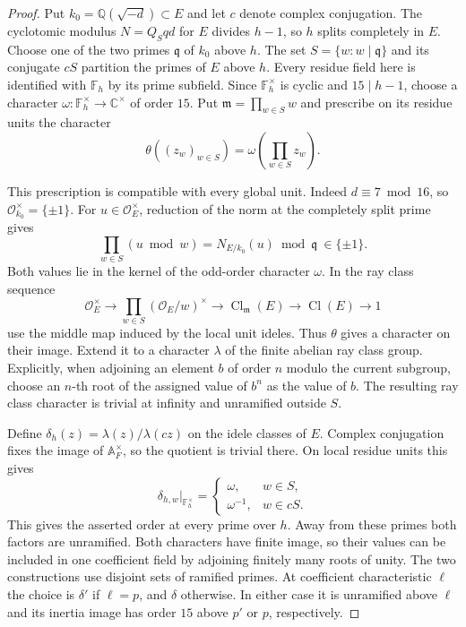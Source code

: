 \begin{proof}
Put \(k_0=\mathbb Q(\sqrt{-d})\subset E\) and let \(c\) denote complex
conjugation. The cyclotomic modulus \(N=Q_Sqd\) for \(E\) divides
\(h-1\), so \(h\) splits completely in \(E\).
Choose one of the two primes \(\mathfrak q\) of \(k_0\) above \(h\).
The set \(S=\{w:w\mid\mathfrak q\}\) and its conjugate \(cS\)
partition the primes of \(E\) above \(h\). Every residue field here
is identified with \(\mathbb F_h\) by its prime subfield.
Since \(\mathbb F_h^\times\) is cyclic and \(15\mid h-1\), choose
a character \(\omega:\mathbb F_h^\times\to\mathbb C^\times\) of order
\(15\). Put \(\mathfrak m=\prod_{w\in S}w\) and prescribe on its residue
units the character
\[
        \theta((z_w)_{w\in S})=\omega\!\left(\prod_{w\in S}z_w\right).
\]

This prescription is compatible with every global unit. Indeed
\(d\equiv7\bmod16\), so \(\mathcal O_{k_0}^\times=\{\pm1\}\). For
\(u\in\mathcal O_E^\times\), reduction of the norm at the completely
split prime gives
\[
       \prod_{w\in S}(u\bmod w)
          =N_{E/k_0}(u)\bmod\mathfrak q\ \in\{\pm1\}.
\]
Both values lie in the kernel of the odd-order character \(\omega\).
In the ray class sequence
\[
 \mathcal O_E^\times \longrightarrow
 \prod_{w\in S}(\mathcal O_E/w)^\times\longrightarrow
 \operatorname{Cl}_{\mathfrak m}(E)\longrightarrow
 \operatorname{Cl}(E)\longrightarrow 1
\]
use the middle map induced by the local unit ideles.
Thus \(\theta\) gives a character on their image.
Extend it to a character \(\lambda\) of the finite abelian ray class
group. Explicitly, when adjoining an element \(b\) of order \(n\)
modulo the current subgroup, choose an \(n\)-th root of the assigned
value of \(b^n\) as the value of \(b\). The resulting ray class
character is trivial at infinity and unramified outside \(S\).

Define \(\delta_h(z)=\lambda(z)/\lambda(cz)\) on the idele classes
of \(E\). Complex conjugation fixes the image of \(\mathbb A_F^\times\),
so the quotient is trivial there. On local residue units this gives
\[
 \delta_{h,w}|_{\mathbb F_h^\times}=
       \begin{cases}\omega,&w\in S,\\ \omega^{-1},&w\in cS.\end{cases}
\] This gives the asserted order at every prime
over \(h\). Away from these primes both factors are unramified.
Both characters have finite image, so their values can be included in
one coefficient field by adjoining finitely many roots of unity.
The two constructions use disjoint sets of ramified primes.
At coefficient characteristic \(\ell\) the choice is \(\delta'\)
if \(\ell=p\), and \(\delta\) otherwise. In either case it is
unramified above \(\ell\) and its inertia image
has order \(15\) above \(p'\) or \(p\), respectively.
\end{proof}
